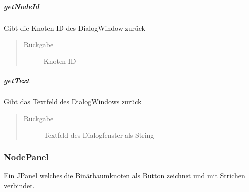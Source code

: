 \documentclass[letterpaper,10pt,ngerman]{sphinxmanual}
\begin{document}
\subparagraph{getNodeId}
\label{\detokenize{com/linuxluigi/edu/view/DialogWindow:getnodeid}}

\begin{fulllineitems}
\label{\detokenize{com/linuxluigi/edu/view/DialogWindow:com.linuxluigi.edu.view.DialogWindow.getNodeId()}}
Gibt die Knoten ID des DialogWindow zurück
\begin{quote}\begin{description}
\item[{Rückgabe}] \leavevmode
Knoten ID

\end{description}\end{quote}

\end{fulllineitems}



\subparagraph{getText}
\label{\detokenize{com/linuxluigi/edu/view/DialogWindow:gettext}}

\begin{fulllineitems}
\label{\detokenize{com/linuxluigi/edu/view/DialogWindow:com.linuxluigi.edu.view.DialogWindow.getText()}}
Gibt das Textfeld des DialogWindows zurück
\begin{quote}\begin{description}
\item[{Rückgabe}] \leavevmode
Textfeld des Dialogfenster als String

\end{description}\end{quote}

\end{fulllineitems}



\subsubsection{NodePanel}
\label{\detokenize{com/linuxluigi/edu/view/NodePanel::doc}}\label{\detokenize{com/linuxluigi/edu/view/NodePanel:nodepanel}}

\begin{fulllineitems}
\label{\detokenize{com/linuxluigi/edu/view/NodePanel:com.linuxluigi.edu.view.NodePanel}}
Ein JPanel welches die Binärbaumknoten als Button zeichnet und mit Strichen verbindet.

\end{fulllineitems}
\end{document}
